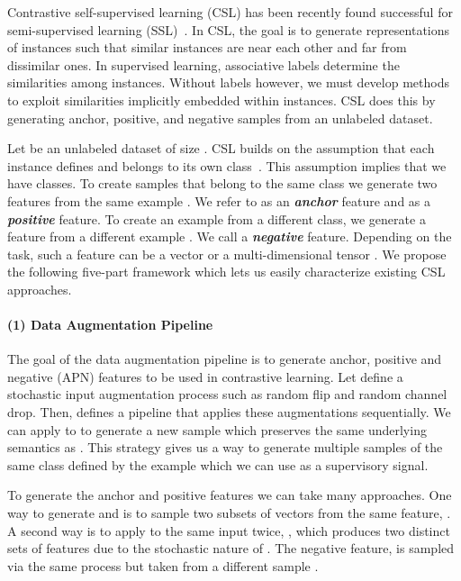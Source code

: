 \documentclass{article}
\begin{document}
Contrastive self-supervised learning (CSL) has been recently found successful for semi-supervised learning (SSL)~\cite{hjelm2018learning,henaff2019data,chen2020simple,tian2019contrastive,he2019momentum}. In CSL, the goal is to generate representations of instances such that similar instances are near each other and far from dissimilar ones. In supervised learning, associative labels determine the similarities among instances. Without labels however, we must develop methods to exploit similarities implicitly embedded within instances. CSL does this by generating anchor, positive, and negative samples from an unlabeled dataset.

Let  be an unlabeled dataset of size . CSL builds on the assumption that each instance defines and belongs to its own class~\cite{dosovitskiy2014discriminative}. This assumption implies that we have  classes. To create samples that belong to the same class we generate two features  from the same example . We refer to  as an \textbf{\textit{anchor}} feature and  as a \textbf{\textit{positive}} feature. To create an example from a different class, we generate a feature  from a different example . We call  a \textit{\textbf{negative}} feature. Depending on the task, such a feature can be a vector   or a multi-dimensional tensor . We propose the following five-part framework which lets us easily characterize existing CSL approaches.

\paragraph{(1) Data Augmentation Pipeline} 

The goal of the data augmentation pipeline is to generate anchor, positive and negative (APN) features to be used in contrastive learning. Let  define a stochastic input augmentation process such as random flip and random channel drop. Then,  defines a pipeline that applies these augmentations sequentially. We can apply  to  to generate a new sample  which preserves the same underlying semantics as . This strategy gives us a way to generate multiple samples of the same class defined by the example  which we can use as a supervisory signal.

To generate the anchor and positive features we can take many approaches. One way to generate  and  is to sample two subsets of vectors from the same feature, . A second way is to apply  to the same input twice, , which produces two distinct sets of features due to the stochastic nature of . The negative feature,  is sampled via the same process but taken from a different sample .
\end{document}
